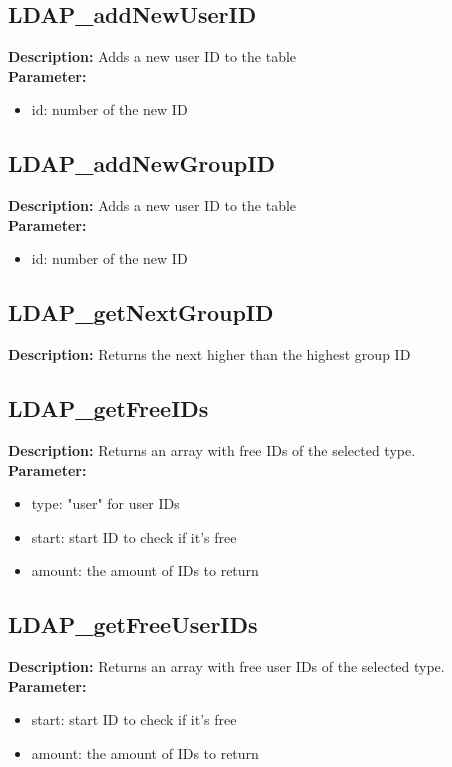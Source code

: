\subsection{LDAP\_addNewUserID}
\textbf{Description:} Adds a new user ID to the table\\
\textbf{Parameter:}
\begin{itemize}
\item id: number of the new ID
\end{itemize}

\subsection{LDAP\_addNewGroupID}
\textbf{Description:} Adds a new user ID to the table\\
\textbf{Parameter:}
\begin{itemize}
\item id: number of the new ID
\end{itemize}

\subsection{LDAP\_getNextGroupID}
\textbf{Description:} Returns the next higher than the highest group ID\\

\subsection{LDAP\_getFreeIDs}
\textbf{Description:} Returns an array with free IDs of the selected type.\\
\textbf{Parameter:}
\begin{itemize}
\item type: "user" for user IDs
\item start: start ID to check if it's free
\item amount: the amount of IDs to return
\end{itemize}

\subsection{LDAP\_getFreeUserIDs}
\textbf{Description:} Returns an array with free user IDs of the selected type.\\
\textbf{Parameter:}
\begin{itemize}
\item start: start ID to check if it's free
\item amount: the amount of IDs to return
\end{itemize}

